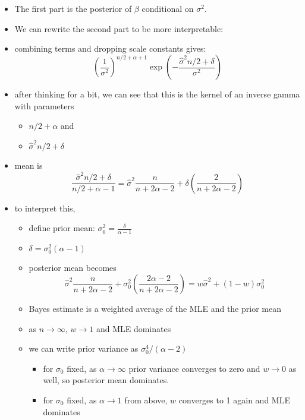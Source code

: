 \begin{itemize}
\begin{itemize}
\item The first part is the posterior of $\beta$ conditional on $\sigma^2$.
\item We can rewrite the second part to be more interpretable:
\item combining terms and dropping scale constants gives:
         \[(\frac{1}{\sigma^2})^{n/2 + \alpha + 1} \exp(- \frac{\hat\sigma^2 n/2 +
         \delta}{\sigma^2})\]
\item after thinking for a bit, we can see that this is the kernel of an inverse
         gamma with parameters
\begin{itemize}
\item $n/2+\alpha$ and
\item $\hat\sigma^2 n/2 + \delta$
\end{itemize}
\item mean is \[\frac{\hat\sigma^2 n/2 + \delta}{n/2 + \alpha - 1}
         = \hat\sigma^2 \frac{n}{n + 2\alpha - 2} +
         \delta(\frac{2}{n + 2\alpha - 2})\]
\item to interpret this,
\begin{itemize}
\item define prior mean: $\sigma_0^2 = \frac{\delta}{\alpha - 1}$
\item $\delta = \sigma^2_0 (\alpha - 1)$
\item posterior mean becomes 
           \[\hat\sigma^2 \frac{n}{n + 2\alpha - 2} +
           \sigma_0^2(\frac{2 \alpha - 2}{n + 2\alpha - 2}) =
           w \hat\sigma^2 + (1-w) \sigma_0^2\]
\item Bayes estimate is a weighted average of the MLE and the
           prior mean
\item as $n \to \infty$, $w \to 1$ and MLE dominates
\item we can write prior variance as $\sigma_0^4 / (\alpha - 2)$
\begin{itemize}
\item for $\sigma_0$ fixed, as $\alpha \to \infty$ prior
             variance converges to zero and $w \to 0$ as well, so
             posterior mean dominates.
\item for $\sigma_0$ fixed, as $\alpha \to 1$ from above, $w$
             converges to 1 again and MLE dominates
\end{itemize}
\end{itemize}
\end{itemize}
\end{itemize}

